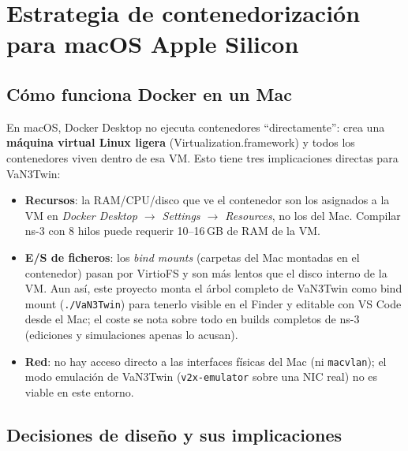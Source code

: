 \documentclass[11pt,a4paper]{article}
\begin{document}
\clearpage

\section{Estrategia de contenedorizaci\'on para macOS Apple Silicon}

\subsection{C\'omo funciona Docker en un Mac}

En macOS, Docker Desktop no ejecuta contenedores ``directamente'': crea una
\textbf{m\'aquina virtual Linux ligera} (Virtualization.framework) y todos los
contenedores viven dentro de esa VM. Esto tiene tres implicaciones directas
para VaN3Twin:

\begin{implicacion}
\begin{itemize}
  \item \textbf{Recursos}: la RAM/CPU/disco que ve el contenedor son los
  asignados a la VM en \emph{Docker Desktop $\to$ Settings $\to$ Resources},
  no los del Mac. Compilar ns-3 con 8 hilos puede requerir 10--16\,GB de RAM
  de la VM.
  \item \textbf{E/S de ficheros}: los \emph{bind mounts} (carpetas del Mac
  montadas en el contenedor) pasan por VirtioFS y son m\'as lentos que el
  disco interno de la VM. Aun as\'i, este proyecto monta el \'arbol completo
  de VaN3Twin como bind mount (\texttt{./VaN3Twin}) para tenerlo visible en
  el Finder y editable con VS Code desde el Mac; el coste se nota sobre todo
  en builds completos de ns-3 (ediciones y simulaciones apenas lo acusan).
  \item \textbf{Red}: no hay acceso directo a las interfaces f\'isicas del
  Mac (ni \texttt{macvlan}); el modo emulaci\'on de VaN3Twin
  (\texttt{v2x-emulator} sobre una NIC real) no es viable en este entorno.
\end{itemize}
\end{implicacion}

\subsection{Decisiones de dise\~no y sus implicaciones}
\end{document}
